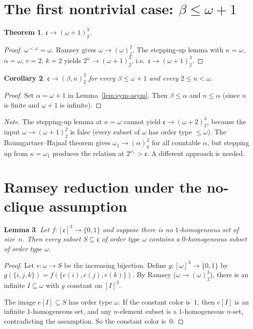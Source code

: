 \documentclass[11pt]{article}
\newtheorem{theorem}{Theorem}
\newtheorem{lemma}[theorem]{Lemma}
\newtheorem{corollary}[theorem]{Corollary}
\theoremstyle{definition}
\theoremstyle{remark}
\newcommand{\cc}{\mathfrak{c}}
\begin{document}
\section{The first nontrivial case: $\beta\le\omega+1$}

\begin{theorem}
\label{thm:omega1}
$\cc\to(\omega+1)^3_2$.
\end{theorem}

\begin{proof}
$\omega^{<\omega}=\omega$. Ramsey gives $\omega\to(\omega)^2_2$. The stepping-up lemma with $\kappa=\omega$, $\alpha=\omega$, $r=2$, $k=2$ yields $2^\omega\to(\omega+1)^3_2$, i.e.\ $\cc\to(\omega+1)^3_2$.
\end{proof}

\begin{corollary}
\label{cor:omega1}
$\cc\to(\beta,n)^3_2$ for every $\beta\le\omega+1$ and every $2\le n<\omega$.
\end{corollary}

\begin{proof}
Set $\alpha=\omega+1$ in Lemma~\ref{lem:sym-asym}. Then $\beta\le\alpha$ and $n\le\alpha$ (since $n$ is finite and $\omega+1$ is infinite).
\end{proof}

\emph{Note.} The stepping-up lemma at $\kappa=\omega$ cannot yield $\cc\to(\omega+2)^3_2$, because the input $\omega\to(\omega+1)^2_2$ is false (every subset of $\omega$ has order type $\le\omega$). The Baumgartner--Hajnal theorem gives $\omega_1\to(\alpha)^2_k$ for all countable $\alpha$, but stepping up from $\kappa=\omega_1$ produces the relation at $2^{\omega_1}>\cc$. A different approach is needed.

\section{Ramsey reduction under the no-clique assumption}

\begin{lemma}
\label{lem:ramsey-red}
Let $f:[\cc]^3\to\{0,1\}$ and suppose there is no $1$-homogeneous set of size~$n$. Then every subset $S\subseteq\cc$ of order type $\omega$ contains a $0$-homogeneous subset of order type $\omega$.
\end{lemma}

\begin{proof}
Let $e:\omega\to S$ be the increasing bijection. Define $g:[\omega]^3\to\{0,1\}$ by $g(\{i,j,k\})=f(\{e(i),e(j),e(k)\})$. By Ramsey ($\omega\to(\omega)^3_2$), there is an infinite $I\subseteq\omega$ with $g$ constant on $[I]^3$.

The image $e[I]\subseteq S$ has order type $\omega$. If the constant color is~$1$, then $e[I]$ is an infinite $1$-homogeneous set, and any $n$-element subset is a $1$-homogeneous $n$-set, contradicting the assumption. So the constant color is~$0$.
\end{proof}
\end{document}
